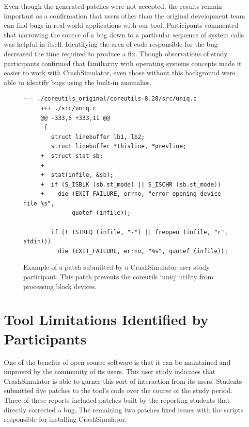 Even though the generated patches were not accepted,
the results remain
important as a confirmation that 
users other than the original development team
can find bugs in real world applications with our tool.
Participants commented that narrowing the source of a bug
down to a particular sequence of system calls
was helpful in itself. Identifying the area of
code responsible for the bug decreased the time required to produce a fix.
Though observations of study participants
confirmed that familiarity with operating systems concepts
made it easier to work with CrashSimulator, even
those without this background were able to identify bugs using the
built-in anomalies.


 \begin{figure}
 \begin{lstlisting}[basicstyle=\ttfamily,gobble=4]
     --- ./coreutils_original/coreutils-8.28/src/uniq.c
     +++ ./src/uniq.c
     @@ -333,6 +333,11 @@
      {
        struct linebuffer lb1, lb2;
        struct linebuffer *thisline, *prevline;
     +  struct stat sb;
     +
     +  stat(infile, &sb);
     +  if (S_ISBLK (sb.st_mode) || S_ISCHR (sb.st_mode))
     +    die (EXIT_FAILURE, errno, "error opening device file %s",
              quotef (infile));

        if (! (STREQ (infile, "-") || freopen (infile, "r", stdin)))
          die (EXIT_FAILURE, errno, "%s", quotef (infile));
\end{lstlisting}
\caption[Participant Submitted Patch]{Example of a patch submitted by a CrashSimulator user study participant.
This patch prevents the coreutils `uniq` utility from processing block devices. }
\label{fig:participantpatch}
\end{figure}

\section{Tool Limitations Identified by Participants}
\label{subsec:crashsim-patches}

One of the benefits of open source software is that it can be maintained and improved by the community of its users.
This user study indicates that CrashSimulator is able to garner this sort of interaction from its users.
Students submitted five patches
to the tool's code over the
course of the study period.
Three of these reports included patches built by the reporting students that directly
corrected a bug.
The remaining two patches fixed issues with the scripts responsible for installing CrashSimulator.

